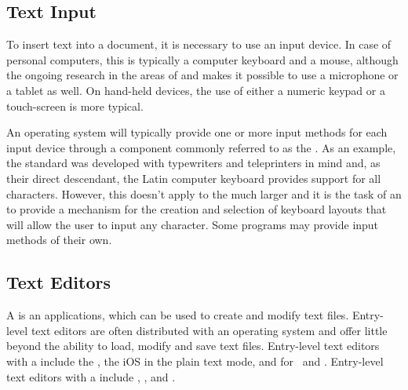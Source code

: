\documentclass[a5paper,10pt]{book}
\begin{document}
\subsection{Text Input}
To insert text into a document, it is necessary to use an input device. In case
of personal computers, this is typically a computer keyboard and a mouse,
although the ongoing research in the areas of  and 
makes it possible to use a microphone or a tablet as well. On hand-held devices,
the use of either a numeric keypad or a touch-screen is more typical.

An operating system will typically provide one or more input methods for each
input device through a component commonly referred to as the . As
an example, the  standard was developed with typewriters and
teleprinters in mind and, as their direct descendant, the Latin computer
keyboard provides support for all  characters. However, this
doesn't apply to the much larger  and it is the task of an
 to provide a mechanism for the creation and selection of keyboard
layouts that will allow the user to input any  character. Some
programs may provide input methods of their own.



\subsection{Text Editors}
A  is an applications, which can be used to create and modify
text files. Entry-level text editors are often distributed with an operating
system and offer little beyond the ability to load, modify and save text files.
Entry-level text editors with a  include the ,
the iOS  in the plain text mode, and  for \Linux\ and
. Entry-level text editors with a  include
,  , and
.
\end{document}

